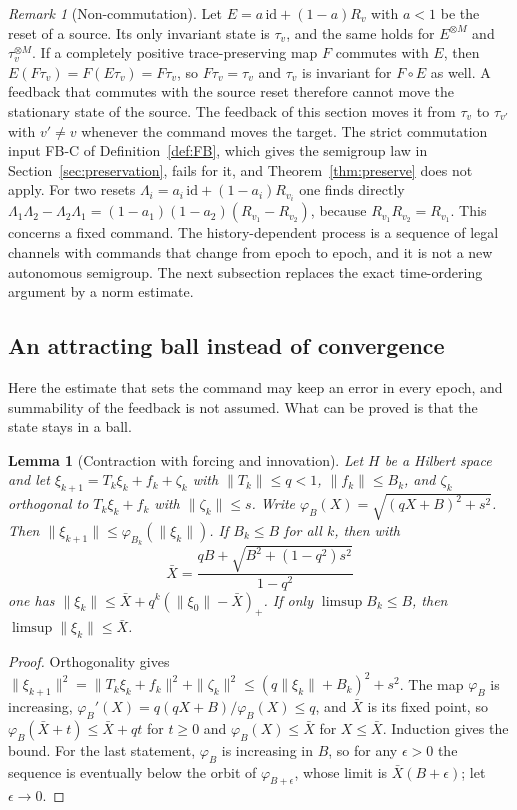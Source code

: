 \documentclass[12pt]{article}
\newtheorem{lemma}[theorem]{Lemma}
\theoremstyle{definition}
\theoremstyle{remark}
\newtheorem{remark}[theorem]{Remark}
\begin{document}
\begin{remark}[Non-commutation]\label{rem:bank_noncomm}
Let $E=a\,\mathrm{id}+(1-a)R_v$ with $a<1$ be the reset of a source. Its only invariant state is $\tau_v$, and the same holds for $E^{\otimes M}$ and $\tau_v^{\otimes M}$. If a completely positive trace-preserving map $F$ commutes with $E$, then $E(F\tau_v)=F(E\tau_v)=F\tau_v$, so $F\tau_v=\tau_v$ and $\tau_v$ is invariant for $F\circ E$ as well. A feedback that commutes with the source reset therefore cannot move the stationary state of the source. The feedback of this section moves it from $\tau_v$ to $\tau_{v'}$ with $v'\ne v$ whenever the command moves the target. The strict commutation input FB-C of Definition~\ref{def:FB}, which gives the semigroup law in Section~\ref{sec:preservation}, fails for it, and Theorem~\ref{thm:preserve} does not apply. For two resets $\Lambda_i=a_i\,\mathrm{id}+(1-a_i)R_{v_i}$ one finds directly $\Lambda_1\Lambda_2-\Lambda_2\Lambda_1=(1-a_1)(1-a_2)(R_{v_1}-R_{v_2})$, because $R_{v_1}R_{v_2}=R_{v_1}$. This concerns a fixed command. The history-dependent process is a sequence of legal channels with commands that change from epoch to epoch, and it is not a new autonomous semigroup. The next subsection replaces the exact time-ordering argument by a norm estimate.
\end{remark}

\subsection{An attracting ball instead of convergence}\label{subsec:bank_ball}

Here the estimate that sets the command may keep an error in every epoch, and summability of the feedback is not assumed. What can be proved is that the state stays in a ball.

\begin{lemma}[Contraction with forcing and innovation]\label{lem:ball}
Let $H$ be a Hilbert space and let $\xi_{k+1}=T_k\xi_k+f_k+\zeta_k$ with $\|T_k\|\le q<1$, $\|f_k\|\le B_k$, and $\zeta_k$ orthogonal to $T_k\xi_k+f_k$ with $\|\zeta_k\|\le s$. Write $\varphi_B(X)=\sqrt{(qX+B)^2+s^2}$. Then $\|\xi_{k+1}\|\le\varphi_{B_k}(\|\xi_k\|)$. If $B_k\le B$ for all $k$, then with
\[
\bar X=\frac{qB+\sqrt{B^2+(1-q^2)s^2}}{1-q^2}
\]
one has $\|\xi_k\|\le\bar X+q^k(\|\xi_0\|-\bar X)_+$. If only $\limsup B_k\le B$, then $\limsup\|\xi_k\|\le\bar X$.
\end{lemma}
\begin{proof}
Orthogonality gives $\|\xi_{k+1}\|^2=\|T_k\xi_k+f_k\|^2+\|\zeta_k\|^2\le(q\|\xi_k\|+B_k)^2+s^2$. The map $\varphi_B$ is increasing, $\varphi_B'(X)=q(qX+B)/\varphi_B(X)\le q$, and $\bar X$ is its fixed point, so $\varphi_B(\bar X+t)\le\bar X+qt$ for $t\ge0$ and $\varphi_B(X)\le\bar X$ for $X\le\bar X$. Induction gives the bound. For the last statement, $\varphi_B$ is increasing in $B$, so for any $\epsilon>0$ the sequence is eventually below the orbit of $\varphi_{B+\epsilon}$, whose limit is $\bar X(B+\epsilon)$; let $\epsilon\to0$.
\end{proof}
\end{document}
